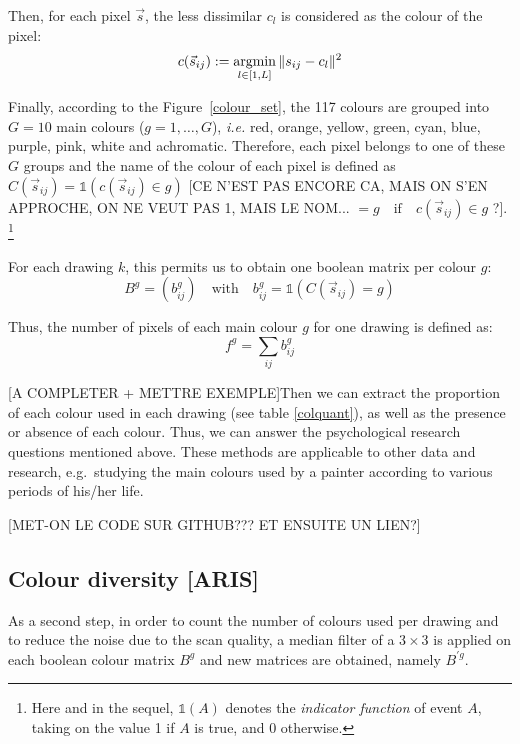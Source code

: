 \documentclass[11pt,a4paper]{article}
\begin{document}
Then, for each pixel \(\vec{s}\), the less dissimilar \(c_l\) is considered as
the colour of the pixel:
\begin{equation*}
c(\vec{s}_{ij}) := \operatornamewithlimits{argmin}_{l \in [1,L]} \| s_{ij} - c_{l} \|^{2}
\end{equation*}

Finally, according to the Figure~\ref{colour_set}, the 117 colours are grouped into $G = 10$
main colours ($g = 1, \dots, G$), \textit{i.e.} red, orange, yellow, green, cyan, blue, purple, pink,
white and achromatic. Therefore, each pixel belongs to one of these
$G$ groups and the name of the colour of each pixel is defined as $C(\vec{s}_{ij}) = \mathds{1}(c(\vec{s}_{ij}) \in g)$ [CE N'EST PAS ENCORE CA, MAIS ON S'EN APPROCHE, ON NE VEUT PAS 1, MAIS LE NOM... $= g \quad \textrm{if} \quad c(\vec{s}_{ij}) \in g$ ?]. \footnote{Here and in the sequel, $\mathds{1}(A)$ denotes the \textit{indicator function} of event $A$, taking on the value 1 if $A$ is true, and 0 otherwise.}

For each drawing $k$, this permits us to obtain one
boolean matrix per colour $g$:
\begin{equation}
B^{g} = (b_{ij}^{g}) \quad \textrm{with} \quad b_{ij}^{g} =  \mathds{1}(C(\vec{s}_{ij}) = g)
\end{equation}

Thus, the number of pixels of each main colour $g$ for one drawing is defined as:
\begin{equation}
	f^{g} = \sum_{ij}b_{ij}^{g}
\end{equation}




{[}A COMPLETER + METTRE EXEMPLE{]}Then we can extract the proportion of
each colour used in each drawing (see table \ref{colquant}), as well as
the presence or absence of each colour. Thus, we can answer the
psychological research questions mentioned above. These methods are
applicable to other data and research, e.g.~studying the main colours
used by a painter according to various periods of his/her life.





[MET-ON LE CODE SUR GITHUB??? ET ENSUITE UN LIEN?]


\subsection{Colour diversity [ARIS]}


As a second step, in order to
count the number of colours used per drawing and to reduce the noise due
to the scan quality, a median filter of a \(3 \times 3\) is applied on
each boolean colour matrix $B^{g}$ and new matrices are obtained, namely
$B^{\prime g}$.
\end{document}
